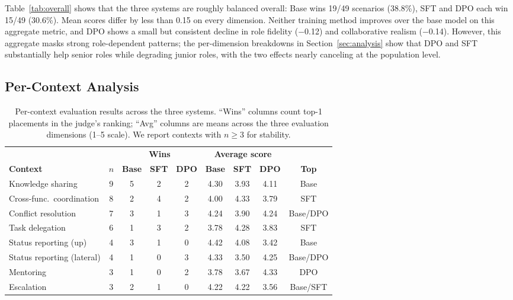 \documentclass{article}
\begin{document}


Table~\ref{tab:overall} shows that the three systems are roughly balanced overall: Base wins 19/49 scenarios (38.8\%), SFT and DPO each win 15/49 (30.6\%). Mean scores differ by less than 0.15 on every dimension. Neither training method improves over the base model on this aggregate metric, and DPO shows a small but consistent decline in role fidelity ($-$0.12) and collaborative realism ($-$0.14). However, this aggregate masks strong role-dependent patterns; the per-dimension breakdowns in Section~\ref{sec:analysis} show that DPO and SFT substantially help senior roles while degrading junior roles, with the two effects nearly canceling at the population level.

\subsection{Per-Context Analysis}

\begin{table}[t]
\caption{Per-context evaluation results across the three systems. ``Wins'' columns count top-1 placements in the judge's ranking; ``Avg'' columns are means across the three evaluation dimensions (1--5 scale). We report contexts with $n \geq 3$ for stability.}
\label{tab:percontext}
\begin{center}
\small
\begin{tabular}{lcccccccc}
\toprule
& & \multicolumn{3}{c}{\textbf{Wins}} & \multicolumn{3}{c}{\textbf{Average score}} & \\
\cmidrule(lr){3-5} \cmidrule(lr){6-8}
\textbf{Context} & $n$ & \textbf{Base} & \textbf{SFT} & \textbf{DPO} & \textbf{Base} & \textbf{SFT} & \textbf{DPO} & \textbf{Top} \\
\midrule
Knowledge sharing & 9 & 5 & 2 & 2 & 4.30 & 3.93 & 4.11 & Base \\
Cross-func.\ coordination & 8 & 2 & 4 & 2 & 4.00 & 4.33 & 3.79 & SFT \\
Conflict resolution & 7 & 3 & 1 & 3 & 4.24 & 3.90 & 4.24 & Base/DPO \\
Task delegation & 6 & 1 & 3 & 2 & 3.78 & 4.28 & 3.83 & SFT \\
Status reporting (up) & 4 & 3 & 1 & 0 & 4.42 & 4.08 & 3.42 & Base \\
Status reporting (lateral) & 4 & 1 & 0 & 3 & 4.33 & 3.50 & 4.25 & Base/DPO \\
Mentoring & 3 & 1 & 0 & 2 & 3.78 & 3.67 & 4.33 & DPO \\
Escalation & 3 & 2 & 1 & 0 & 4.22 & 4.22 & 3.56 & Base/SFT \\
\bottomrule
\end{tabular}
\end{center}
\end{table}
\end{document}
